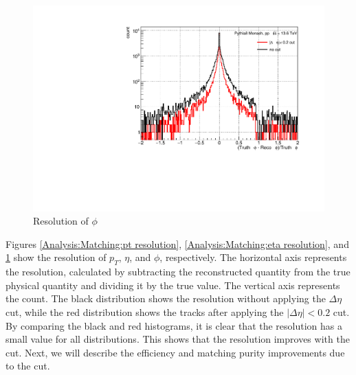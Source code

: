                 \begin{figure}[H]
                    \centering
                    \includegraphics[keepaspectratio, scale=0.4]{fig/3_5_6_reso_phi.pdf} 
                    \caption{Resolution of $\phi$}
                    \label{Analysis:Matching:phi resolution}
                \end{figure}
                Figures \ref{Analysis:Matching:pt resolution}, \ref{Analysis:Matching:eta resolution}, and \ref{Analysis:Matching:phi resolution} show the resolution of \(p_T\), \(\eta\), and \(\phi\), respectively. The horizontal axis represents the resolution, calculated by subtracting the reconstructed quantity from the true physical quantity and dividing it by the true value. The vertical axis represents the count. The black distribution shows the resolution without applying the \(\Delta \eta\) cut, while the red distribution shows the tracks after applying the \(|\Delta \eta| < 0.2\) cut. By comparing the black and red histograms, it is clear that the resolution has a small value for all distributions. This shows that the resolution improves with the cut. Next, we will describe the efficiency and matching purity improvements due to the cut.
